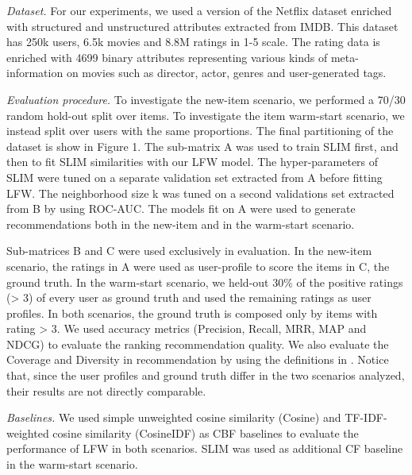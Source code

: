 \documentclass{sig-alternate}
\begin{document}
\textit{Dataset.} For our experiments, we used a version of the Netflix
dataset enriched with structured and unstructured attributes extracted
from IMDB. This dataset has 250k users, 6.5k movies and
8.8M ratings in 1-5 scale. The rating data is enriched with 4699
binary attributes representing various kinds of meta-information
on movies such as director, actor, genres and user-generated tags.
\newline

\textit{Evaluation procedure.} To investigate the new-item scenario, we
performed a 70/30 random hold-out split over items. To investigate
the item warm-start scenario, we instead split over users with the
same proportions. The final partitioning of the dataset is show in
Figure 1. The sub-matrix A was used to train SLIM first, and then
to fit SLIM similarities with our LFW model. The hyper-parameters
of SLIM were tuned on a separate validation set extracted from A
before fitting LFW. The neighborhood size k was tuned on a second
validations set extracted from B by using ROC-AUC. The models fit
on A were used to generate recommendations both in the new-item
and in the warm-start scenario.

Sub-matrices B and C were used exclusively in evaluation. In
the new-item scenario, the ratings in A were used as user-profile to
score the items in C, the ground truth. In the warm-start scenario,
we held-out 30\% of the positive ratings (> 3) of every user as
ground truth and used the remaining ratings as user profiles. In
both scenarios, the ground truth is composed only by items with
rating > 3. We used accuracy metrics (Precision, Recall, MRR, MAP
and NDCG) to evaluate the ranking recommendation quality. We
also evaluate the Coverage and Diversity in recommendation by
using the definitions in \cite{3}. Notice that, since the user profiles and
ground truth differ in the two scenarios analyzed, their results are
not directly comparable.

\textit{Baselines.} We used simple unweighted cosine similarity (Cosine)
and TF-IDF-weighted cosine similarity (CosineIDF) as CBF baselines
to evaluate the performance of LFW in both scenarios. SLIM
was used as additional CF baseline in the warm-start scenario.
\end{document}
